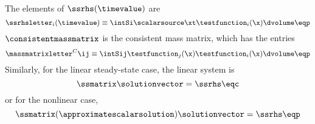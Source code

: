 The elements of $\ssrhs(\timevalue)$ are
\begin{equation}
  \ssrhsletter_i(\timevalue) \equiv \intSi \scalarsource\xt\testfunction_i(\x)
  \dvolume \eqp
\end{equation}
$\consistentmassmatrix$ is the consistent mass matrix, which has the entries
\begin{equation}\label{eq:massmatrix}
  \massmatrixletter^C\ij \equiv \intSij
  \testfunction_j(\x)\testfunction_i(\x) \dvolume \eqp
\end{equation}
Similarly, for the linear steady-state case, the linear system is
\begin{equation}
  \ssmatrix\solutionvector = \ssrhs \eqc
\end{equation}
or for the nonlinear case,
\begin{equation}
  \ssmatrix(\approximatescalarsolution)\solutionvector = \ssrhs \eqp
\end{equation}
